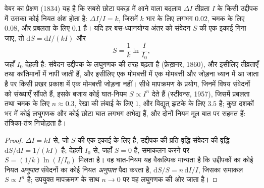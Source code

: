 \begin{theorem}[वेबर, फ़ेख़नर और स्टीवन्स]\label{thm:b3:sensory-systems:weber}
वेबर का प्रेक्षण (1834) यह है कि सबसे छोटा पकड़ में आने वाला बदलाव
$\Delta I$ तीव्रता $I$ के किसी उद्दीपक में उसका कोई नियत अंश होता है:
$\Delta I/I = k$, जिसमें $k$ भार के लिए लगभग $0.02$, चमक के लिए
$0.08$, और प्रबलता के लिए $0.1$ है। यदि हर बस-ध्यानयोग्य अंतर को
संवेदन $S$ की एक इकाई गिना जाए, तो $\mathrm{d}S = \mathrm{d}I/
(kI)$ और
\[
S = \frac{1}{k}\ln\frac{I}{I_{0}} ,
\]
जहाँ $I_{0}$ देहली है: संवेदन उद्दीपक के लघुगणक की तरह बढ़ता है
(फ़ेख़नर, 1860), और इसीलिए तीव्रताएँ  तथा कांतिमानों में नापी
जाती हैं, और इसीलिए एक मोमबत्ती में एक मोमबत्ती और जोड़ना ध्यान में आ
जाता है पर किसी प्रखर प्रकाश में एक मोमबत्ती जोड़ना नहीं। सीधे
मापक्रमण के प्रयोग, जिनमें विषय संवेदनों को संख्याएँ सौंपते हैं, इसके
बजाय कोई घात-नियम $S \propto I^{n}$ देते हैं (स्टीवन्स, 1957), जिसमें
प्रबलता तथा चमक के लिए $n \approx
0.3$, रेखा की लंबाई के लिए $1$, और विद्युत् झटके के लिए $3.5$ है; कुछ
दशकों भर में कोई लघुगणक और कोई छोटा घात लगभग अभेद्य हैं, और दोनों नियम
मूल बात पर सहमत हैं: तंत्रिका-तंत्र निचोड़ता है।
\end{theorem}
\begin{proof}
$\Delta I = kI$ से, जो $S$ की एक इकाई के लिए है, उद्दीपक की प्रति वृद्धि
संवेदन की वृद्धि $\mathrm{d}S/\mathrm{d}I = 1/(kI)$ है; देहली
$I_{0}$ से, जहाँ $S = 0$ है, समाकलन करने पर $S = (1/k)
\ln(I/I_{0})$ मिलता है। वह घात-नियम यह वैकल्पिक मान्यता है कि
उद्दीपकों का कोई नियत \emph{अनुपात} संवेदनों का कोई नियत \emph{अनुपात}
पैदा करता है, $\mathrm{d}S/S = n\,\mathrm{d}I/I$, जिसका समाकल
$S \propto I^{n}$ है; उपयुक्त मापक्रमण के साथ $n \to 0$ पर वह लघुगणक की
ओर जाता है।
\end{proof}

